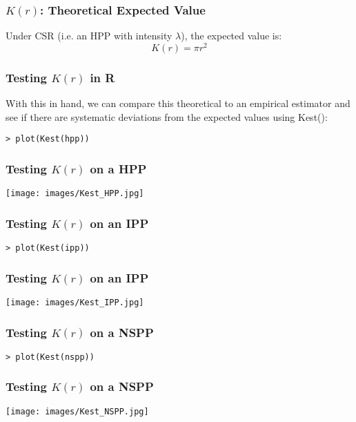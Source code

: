 \documentclass{beamer}
\begin{document}
\begin{frame}[fragile]
	\frametitle{$K(r)$: Theoretical Expected Value}

	Under CSR (i.e. an HPP with intensity $\lambda$), the expected value is:
	\[
		K(r) = \pi r^2
	\]
\end{frame}

\begin{frame}[fragile]
	\frametitle{Testing $K(r)$ in R}
	
	With this in hand, we can compare this theoretical to an empirical estimator and see if there are systematic deviations from the expected values using Kest():

	\begin{verbatim}
> plot(Kest(hpp))
	\end{verbatim}
\end{frame}

\begin{frame}[fragile]
	\frametitle{Testing $K(r)$ on a HPP}

	\begin{center}
		\texttt{[image: images/Kest\_HPP.jpg]}
	\end{center}
\end{frame}

\begin{frame}[fragile]
	\frametitle{Testing $K(r)$ on an IPP}

	\begin{verbatim}
> plot(Kest(ipp))
	\end{verbatim}
\end{frame}

\begin{frame}[fragile]
	\frametitle{Testing $K(r)$ on an IPP}

	\begin{center}
		\texttt{[image: images/Kest\_IPP.jpg]}
	\end{center}
\end{frame}

\begin{frame}[fragile]
	\frametitle{Testing $K(r)$ on a NSPP}

	\begin{verbatim}
> plot(Kest(nspp))
	\end{verbatim}
\end{frame}

\begin{frame}[fragile]
	\frametitle{Testing $K(r)$ on a NSPP}

	\begin{center}
		\texttt{[image: images/Kest\_NSPP.jpg]}
	\end{center}
\end{frame}
\end{document}
